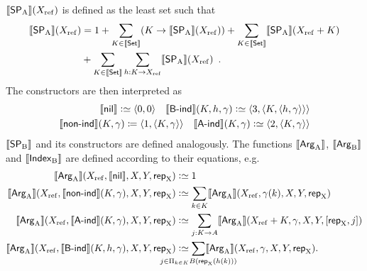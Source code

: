 \documentclass{article}
\begin{document}
$\llbracket \mathsf{SP}_{\mathrm{A}} \rrbracket(X_{\mathrm{ref}})$ is defined as the least set such that
\begin{align*}
\llbracket \mathsf{SP}_{\mathrm{A}} \rrbracket(X_{\mathrm{ref}}) &= 1 + \sum_{K \in \llbracket \mathsf{Set} \rrbracket}(K \to \llbracket \mathsf{SP}_{\mathrm{A}} \rrbracket(X_{\mathrm{ref}}))
  + \sum_{K \in \llbracket \mathsf{Set} \rrbracket}\llbracket \mathsf{SP}_{\mathrm{A}} \rrbracket(X_{\mathrm{ref}} + K) \\
 & {} + \sum_{K \in \llbracket \mathsf{Set} \rrbracket}\sum_{h : K \to X_{\mathrm{ref}}}\llbracket \mathsf{SP}_{\mathrm{A}} \rrbracket(X_{\mathrm{ref}}) \enspace .
\end{align*}
%
The constructors are then interpreted as
%
\begin{align*}
 \llbracket \mathsf{nil} \rrbracket \mathrel{\mathop:}\simeq \langle 0, 0\rangle \quad
 \llbracket \mathsf{B}\text{-}\mathsf{ind} \rrbracket(K, h, \gamma) \mathrel{\mathop:}\simeq \langle 3 , \langle K, \langle h, \gamma \rangle\rangle\rangle
   \\
  \llbracket \mathsf{non}\text{-}\mathsf{ind} \rrbracket(K, \gamma) \coloneqq \langle 1 , \langle K, \gamma
  \rangle\rangle \quad \llbracket \mathsf{A}\text{-}\mathsf{ind} \rrbracket(K, \gamma) \mathrel{\mathop:}\simeq \langle 2 , \langle K, \gamma \rangle\rangle
\end{align*}
$\llbracket \mathsf{SP}_{\mathrm{B}} \rrbracket$ and its constructors are defined analogously. The
functions $\llbracket \mathsf{Arg}_{\mathrm{A}} \rrbracket$, $\llbracket \mathsf{Arg}_{\mathrm{B}} \rrbracket$ and $\llbracket \mathsf{Index}_{\mathrm{B}} \rrbracket$ are defined
according to their equations, e.g.\
\begin{align*}
  \sem{\ArgA}(\Xref, \sem{\nilA}, X, Y, \repA) &\colonsimeq 1 \\
\sem{\ArgA}(\Xref, \sem{\nonindA}(K, \gamma), X, Y, \repA) &\colonsimeq
  \sum_{k \in K} \sem{\ArgA}(\Xref, \gamma(k), X, Y, \repA) \\
\sem{\ArgA}(\Xref, \sem{\AindA}(K, \gamma), X, Y, \repA) &\colonsimeq
  \sum_{j : K \to A}\sem{\ArgA}(\Xref + K, \gamma, X, Y, [\repA, j]) \\
\sem{\ArgA}(\Xref, \sem{\BindA}(K, h, \gamma), X, Y, \repA) &\colonsimeq
  \sum_{\mathclap{j \in \Pi_{k \in K} B(\repA (h(k)))}}\sem{\ArgA}(\Xref, \gamma, X, Y, \repA).
\end{align*}
\end{document}
